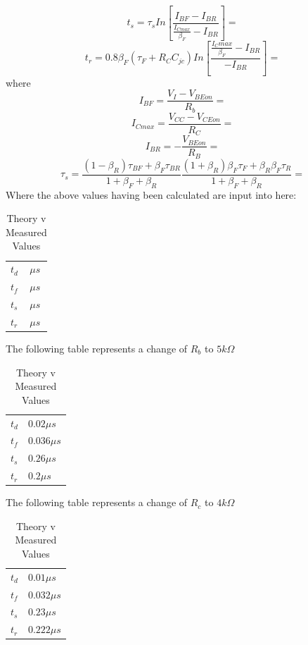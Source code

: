 \documentclass[12pt]{article}
\begin{document}
$$t_s=\tau_sIn\left[\frac{I_{BF}-I_{BR}}{\frac{I_{C max}}{\beta_F}-I_{BR}}\right]=$$
$$t_r=0.8\beta_F\left(\tau_F+R_CC_{jc}\right)In\left[\frac{\frac{I_C max}{\beta_F}-I_{BR}}{-I_{BR}}\right]=$$
where
$$I_{BF}=\frac{V_I-V_{BE on}}{R_b}=$$
$$I_{C max}=\frac{V_{CC}-V_{CE on}}{R_C}=$$
$$I_{BR}=-\frac{V_{BE on}}{R_B}=$$
$$\tau_s=\frac{(1-\beta_R)\tau_{BF}+\beta_F\tau_{BR}}{1+\beta_F+\beta_R}\frac{(1+\beta_R)\beta_F\tau_F+\beta_R\beta_F\tau_R}{1+\beta_F+\beta_R}=$$
Where the above values having been calculated are input into here:
\begin{table}[h]
\centering
\begin{tabular}{ll}
$t_d$ & $\mu s$\\
$t_f$ & $\mu s$\\
$t_s$ & $\mu s$\\
$t_r$ & $\mu s$
\end{tabular}
\caption{Theory v Measured Values}
\end{table}
The following table represents a change of $R_b$ to $5k\Omega$
\begin{table}[h]
\centering
\begin{tabular}{ll}
$t_d$ & $0.02\mu s$\\
$t_f$ & $0.036\mu s$\\
$t_s$ & $0.26\mu s$\\
$t_r$ & $0.2\mu s$
\end{tabular}
\caption{Theory v Measured Values}
\end{table}
The following table represents a change of $R_c$ to $4k\Omega$
\begin{table}[h]
\centering
\begin{tabular}{ll}
$t_d$ & $0.01\mu s$\\
$t_f$ & $0.032\mu s$\\
$t_s$ & $0.23\mu s$\\
$t_r$ & $0.222\mu s$
\end{tabular}
\caption{Theory v Measured Values}
\end{table}

\end{document}
